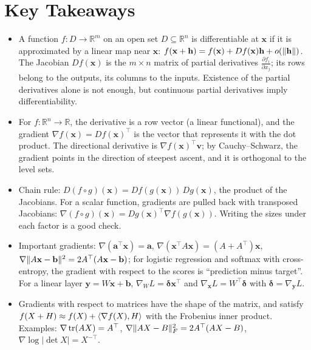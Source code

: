 \section{Key Takeaways}
\begin{itemize}[leftmargin=*]
    \item A function $f: D \to \mathbb{R}^m$ on an open set $D \subseteq \mathbb{R}^n$ is differentiable at $\mathbf{x}$ if it is approximated by a linear map near $\mathbf{x}$: $f(\mathbf{x} + \mathbf{h}) = f(\mathbf{x}) + Df(\mathbf{x})\mathbf{h} + o(\lVert \mathbf{h} \rVert)$. The Jacobian $Df(\mathbf{x})$ is the $m \times n$ matrix of partial derivatives $\frac{\partial f_i}{\partial x_j}$; its rows belong to the outputs, its columns to the inputs. Existence of the partial derivatives alone is not enough, but continuous partial derivatives imply differentiability.
    \item For $f: \mathbb{R}^n \to \mathbb{R}$, the derivative is a row vector (a linear functional), and the gradient $\nabla f(\mathbf{x}) = Df(\mathbf{x})^\top$ is the vector that represents it with the dot product. The directional derivative is $\nabla f(\mathbf{x})^\top\mathbf{v}$; by Cauchy--Schwarz, the gradient points in the direction of steepest ascent, and it is orthogonal to the level sets.
    \item Chain rule: $D(f \circ g)(\mathbf{x}) = Df(g(\mathbf{x}))\,Dg(\mathbf{x})$, the product of the Jacobians. For a scalar function, gradients are pulled back with transposed Jacobians: $\nabla(f \circ g)(\mathbf{x}) = Dg(\mathbf{x})^\top\nabla f(g(\mathbf{x}))$. Writing the sizes under each factor is a good check.
    \item Important gradients: $\nabla(\mathbf{a}^\top\mathbf{x}) = \mathbf{a}$, $\nabla(\mathbf{x}^\top A\mathbf{x}) = (A + A^\top)\mathbf{x}$, $\nabla\lVert A\mathbf{x} - \mathbf{b} \rVert^2 = 2A^\top(A\mathbf{x} - \mathbf{b})$; for logistic regression and softmax with cross-entropy, the gradient with respect to the scores is ``prediction minus target''. For a linear layer $\mathbf{y} = W\mathbf{x} + \mathbf{b}$, $\nabla_W L = \boldsymbol{\delta}\mathbf{x}^\top$ and $\nabla_{\mathbf{x}} L = W^\top\boldsymbol{\delta}$ with $\boldsymbol{\delta} = \nabla_{\mathbf{y}} L$.
    \item Gradients with respect to matrices have the shape of the matrix, and satisfy $f(X + H) \approx f(X) + \langle \nabla f(X), H \rangle$ with the Frobenius inner product. Examples: $\nabla\operatorname{tr}(AX) = A^\top$, $\nabla\lVert AX - B \rVert_F^2 = 2A^\top(AX - B)$, $\nabla\log|\det X| = X^{-\top}$.

\end{itemize}
